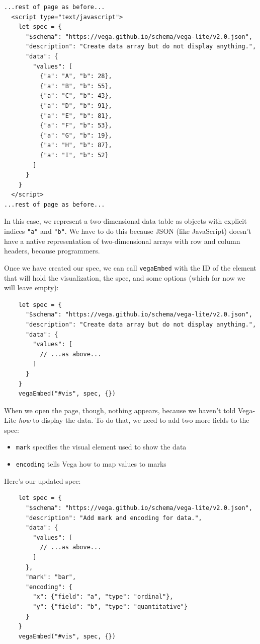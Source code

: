 \begin{verbatim}
...rest of page as before...
  <script type="text/javascript">
    let spec = {
      "$schema": "https://vega.github.io/schema/vega-lite/v2.0.json",
      "description": "Create data array but do not display anything.",
      "data": {
        "values": [
          {"a": "A", "b": 28},
          {"a": "B", "b": 55},
          {"a": "C", "b": 43},
          {"a": "D", "b": 91},
          {"a": "E", "b": 81},
          {"a": "F", "b": 53},
          {"a": "G", "b": 19},
          {"a": "H", "b": 87},
          {"a": "I", "b": 52}
        ]
      }
    }
  </script>
...rest of page as before...
\end{verbatim}

In this case, we represent a two-dimensional data table as objects with
explicit indices \texttt{"a"} and \texttt{"b"}. We have to do this
because JSON (like JavaScript) doesn't have a native representation of
two-dimensional arrays with row and column headers, because programmers.

Once we have created our spec, we can call \texttt{vegaEmbed} with the
ID of the element that will hold the visualization, the spec, and some
options (which for now we will leave empty):

\begin{verbatim}
    let spec = {
      "$schema": "https://vega.github.io/schema/vega-lite/v2.0.json",
      "description": "Create data array but do not display anything.",
      "data": {
        "values": [
          // ...as above...
        ]
      }
    }
    vegaEmbed("#vis", spec, {})
\end{verbatim}

When we open the page, though, nothing appears, because we haven't told
Vega-Lite \emph{how} to display the data. To do that, we need to add two
more fields to the spec:

\begin{itemize}
\tightlist
\item
  \texttt{mark} specifies the visual element used to show the data
\item
  \texttt{encoding} tells Vega how to map values to marks
\end{itemize}

Here's our updated spec:

\begin{verbatim}
    let spec = {
      "$schema": "https://vega.github.io/schema/vega-lite/v2.0.json",
      "description": "Add mark and encoding for data.",
      "data": {
        "values": [
          // ...as above...
        ]
      },
      "mark": "bar",
      "encoding": {
        "x": {"field": "a", "type": "ordinal"},
        "y": {"field": "b", "type": "quantitative"}
      }
    }
    vegaEmbed("#vis", spec, {})
\end{verbatim}

